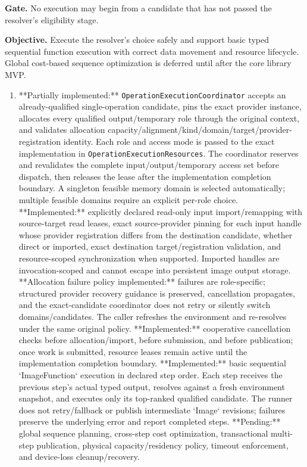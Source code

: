 \textbf{Gate.} No execution may begin from a candidate that has not passed the resolver's eligibility stage.


\textbf{Objective.} Execute the resolver's choice safely and support basic typed sequential function execution with correct data movement and resource lifecycle. Global cost-based sequence optimization is deferred until after the core library MVP.

\deliverables
\begin{enumerate}
  \item **Partially implemented:** \texttt{OperationExecutionCoordinator} accepts an already-qualified single-operation candidate, pins the exact provider instance, allocates every qualified output/temporary role through the original context, and validates allocation capacity/alignment/kind/domain/target/provider-registration identity. Each role and access mode is passed to the exact implementation in \texttt{OperationExecutionResources}. The coordinator reserves and revalidates the complete input/output/temporary access set before dispatch, then releases the lease after the implementation completion boundary. A singleton feasible memory domain is selected automatically; multiple feasible domains require an explicit per-role choice. **Implemented:** explicitly declared read-only input import/remapping with source-target read leases, exact source-provider pinning for each input handle whose provider registration differs from the destination candidate, whether direct or imported, exact destination target/registration validation, and resource-scoped synchronization when supported. Imported handles are invocation-scoped and cannot escape into persistent image output storage. **Allocation failure policy implemented:** failures are role-specific; structured provider recovery guidance is preserved, cancellation propagates, and the exact-candidate coordinator does not retry or silently switch domains/candidates. The caller refreshes the environment and re-resolves under the same original policy. **Implemented:** cooperative cancellation checks before allocation/import, before submission, and before publication; once work is submitted, resource leases remain active until the implementation completion boundary. **Implemented:** basic sequential `ImageFunction` execution in declared step order. Each step receives the previous step's actual typed output, resolves against a fresh environment snapshot, and executes only its top-ranked qualified candidate. The runner does not retry/fallback or publish intermediate `Image` revisions; failures preserve the underlying error and report completed steps. **Pending:** global sequence planning, cross-step cost optimization, transactional multi-step publication, physical capacity/residency policy, timeout enforcement, and device-loss cleanup/recovery.

\end{enumerate}
